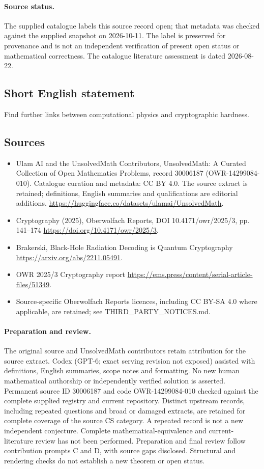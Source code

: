 \documentclass[11pt]{article}
\begin{document}
\paragraph{Source status.}
The supplied catalogue labels this source record open; that metadata was checked against the supplied snapshot on 2026-10-11. The label is preserved for provenance and is not an independent verification of present open status or mathematical correctness. The catalogue literature assessment is dated 2026-08-22.
\subsection{Short English statement}
Find further links between computational physics and cryptographic hardness.
\subsection{Sources}
\begin{itemize}
\item[S1] Ulam AI and the UnsolvedMath Contributors, UnsolvedMath: A Curated Collection of Open Mathematics Problems, record 30006187 (OWR-14299084-010). Catalogue curation and metadata: CC BY 4.0. The source extract is retained; definitions, English summaries and qualifications are editorial additions.
\url{https://huggingface.co/datasets/ulamai/UnsolvedMath}.
\item[S2] Cryptography (2025), Oberwolfach Reports, DOI 10.4171/owr/2025/3, pp. 141--174
\url{https://doi.org/10.4171/owr/2025/3}.
\item[S3] Brakerski, Black-Hole Radiation Decoding is Quantum Cryptography
\url{https://arxiv.org/abs/2211.05491}.
\item[S4] OWR 2025/3 Cryptography report
\url{https://ems.press/content/serial-article-files/51349}.
\item Source-specific Oberwolfach Reports licences, including CC BY-SA 4.0 where applicable, are retained; see THIRD\_PARTY\_NOTICES.md.
\end{itemize}
\paragraph{Preparation and review.}
The original source and UnsolvedMath contributors retain attribution for the source extract. Codex (GPT-6; exact serving revision not exposed) assisted with definitions, English summaries, scope notes and formatting. No new human mathematical authorship or independently verified solution is asserted. Permanent source ID 30006187 and code OWR-14299084-010 checked against the complete supplied registry and current repository. Distinct upstream records, including repeated questions and broad or damaged extracts, are retained for complete coverage of the source CS category. A repeated record is not a new independent conjecture. Complete mathematical-equivalence and current-literature review has not been performed. Preparation and final review follow contribution prompts C and D, with source gaps disclosed. Structural and rendering checks do not establish a new theorem or open status.
\label{end:30006187}
\end{document}
